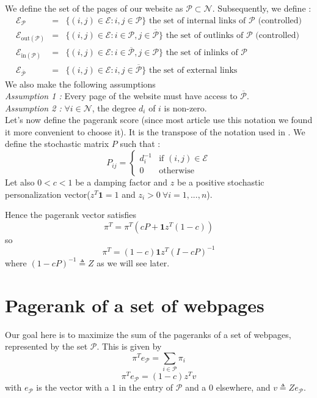 \documentclass{article}
\newcommand{\1}{\mathbf{1}}
\theoremstyle{definition}
\begin{document}
We define the set of the pages of our website as  \(\mathcal{P} \subset \mathcal{N}\). Subsequently, we define :
\begin{eqnarray*}
\mathcal{E}_{\mathcal{P}} & = & \{(i,j)\in \mathcal{E} : i,j \in \mathcal{P}\} \text{ the set of internal links of }\mathcal{P} \text{ (controlled)} \\
  \mathcal{E}_{\text{out}(\mathcal{P})} & = & \{(i,j)\in \mathcal{E} : i \in \mathcal{P},j \in \overline{\mathcal{P}}\} \text{ the set of outlinks of }\mathcal{P} \text{ (controlled)}\\
  \mathcal{E}_{\text{in}(\mathcal{P})} & = & \{(i,j)\in \mathcal{E} : i \in \overline{\mathcal{P}},j \in \mathcal{P}\} \text{ the set of inlinks of }\mathcal{P} \\
\mathcal{E}_{\overline{\mathcal{P}}} & = & \{(i,j)\in \mathcal{E} : i,j \in \overline{\mathcal{P}}\} \text{ the set of external links}
\end{eqnarray*}
We also make the following assumptions\\
\textit{Assumption 1 :} Every page of the website must have access to \(\overline{\mathcal{P}}\).\\
\textit{Assumption 2 :} \(\forall i\in \mathcal{N}\), the degree \(d_i\) of \(i\) is non-zero.\\
Let's now define the pagerank score (since most article use this notation we found it more convenient to choose it). It is the transpose of the notation used in \cite{leskovec}.
We define the stochastic matrix \(P\) such that :
\[ P_{ij} = \left\lbrace \begin{array}{ll}
d_i^{-1} & \text{if }(i,j)\in \mathcal{E} \\
0 & \text{otherwise}
\end{array}
\right.\]
Let also \(0<c<1\) be a damping factor and \(z\) be a positive stochastic personalization vector(\(z^T \mathbf{1} = 1\) and \(z_i>0 \:\forall i = 1,...,n\)).

Hence the pagerank vector satisfies
\[ \pi^T = \pi^T (cP + \1 z^T(1-c)) \]
so
\[ \pi^T = (1-c)\1 z^T(I - cP)^{-1} \]
where \((1 - cP)^{-1} \triangleq Z\) as we will see later.
\section{Pagerank of a set of webpages}
Our goal here is to maximize the sum of the pageranks of a set of webpages, represented by the set \(\mathcal{P}\). This is given by
\[\pi^Te_{\mathcal{P}} = \sum_{i\in \mathcal{P}}\pi_i\]
\[\pi^Te_{\mathcal{P}} = (1-c)z^Tv\]
with \(e_{\mathcal{P}}\) is the vector with a \(1\) in the entry of \(\mathcal{P}\) and a \(0\) elsewhere, and \(v \triangleq Ze_{\mathcal{P}}\).
\end{document}
